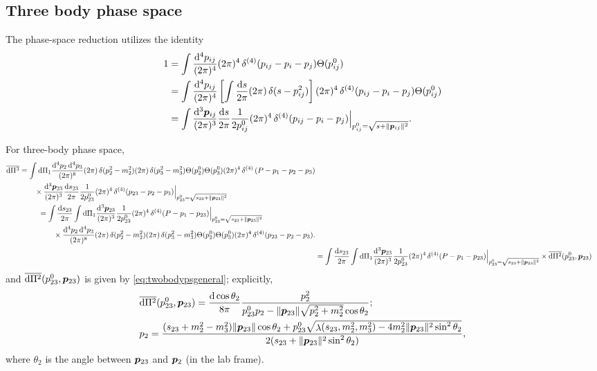 \documentclass[CheatSheet]{subfiles}
\begin{document}
\subsection{Three body phase space}
The phase-space reduction utilizes the identity~\cite{Hitoshi233B}
\begin{align}
 1
&= \int\frac{\dd^4 p_{ij}}{(2\pi)^4}(2\pi)^4\diracdelta[4](p_{ij}-p_i-p_j)\Theta(p_{ij}^0)
\\
&= \int\frac{\dd^4 p_{ij}}{(2\pi)^4}
\left[\int\frac{\dd s}{2\pi}(2\pi)\diracdelta(s-p_{ij}^2)\right]
(2\pi)^4\diracdelta[4](p_{ij}-p_i-p_j)\Theta(p_{ij}^0)
\\
&= \int\ddP{p_{ij}}
\frac{\dd s}{2\pi}\frac{1}{2p_{ij}^0}
(2\pi)^4\diracdelta[4](p_{ij}-p_i-p_j)\Big|_{p_{ij}^0=\sqrt{s+\|\vc p_{ij}\|^2}}.
\end{align}

For three-body phase space,
\begin{align}
\begin{split}
  \overline{\dd\Pi^3}
 &= \int\dd\Pi_1
 \frac{\dd^4 p_2\dd^4 p_3}{(2\pi)^8}
 (2\pi)\diracdelta(p_2^2-m_2^2)
 (2\pi)\diracdelta(p_3^2-m_3^2)
 \Theta(p_2^0)\Theta(p_3^0)
 (2\pi)^4\diracdelta[4]\left(P-p_1-p_2-p_3\right)
 \\&\qquad\times
\ddP{p_{23}}
\frac{\dd s_{23}}{2\pi}\frac{1}{2p_{23}^0}
(2\pi)^4\diracdelta[4](p_{23}-p_2-p_3)\Big|_{p_{23}^0=\sqrt{s_{23}+\|\vc p_{23}\|^2}}
\end{split}
\\
\begin{split}
 &= \int
\frac{\dd s_{23}}{2\pi}
\int
\dd\Pi_1
\ddP{p_{23}}
\frac{1}{2p_{23}^0}
 (2\pi)^4\diracdelta[4](P-p_1-p_{23})
\Big|_{p_{23}^0=\sqrt{s_{23}+\|\vc p_{23}\|^2}}
 \\&\qquad\times
 \frac{\dd^4 p_2\dd^4 p_3}{(2\pi)^8}
 (2\pi)\diracdelta(p_2^2-m_2^2)
 (2\pi)\diracdelta(p_3^2-m_3^2)
 \Theta(p_2^0)\Theta(p_3^0)
(2\pi)^4\diracdelta[4](p_{23}-p_2-p_3).
\end{split}
\\ &= \int
\frac{\dd s_{23}}{2\pi}
\int
\dd\Pi_1
\ddP{p_{23}}
\frac{1}{2p_{23}^0}
 (2\pi)^4\diracdelta[4](P-p_1-p_{23})
\Big|_{p_{23}^0=\sqrt{s_{23}+\|\vc p_{23}\|^2}}
\times \overline{\dd\Pi^2}(p^0_{23}, \vc p_{23})
\end{align}
and $\overline{\mathop{}\!\mathrm{d}\Pi^2}(p^0_{23}, {\boldsymbol{p}}_{23})$ is given by \cref{eq:twobodypsgeneral}; explicitly,
\begin{align}
& \overline{\mathop{}\!\mathrm{d}\Pi^2}(p^0_{23}, {\boldsymbol{p}}_{23}) = 
\frac{\mathop{}\!\mathrm{d}\cos\theta_{2}}{8\pi}
\frac{p_{2}^2}{p^0_{23}p_2 - \|{\boldsymbol{p}}_{23}\|\sqrt{p_2^2+m_2^2}\cos\theta_2};
\\
&
p_2=\frac{(s_{23}+m_2^2-m_3^2)\|{\boldsymbol{p}}_{23}\|\cos\theta_2
 + p_{23}^0\sqrt{\mathop{\lambda}(s_{23},m_2^2,m_3^2)-4m_2^2 \|{\boldsymbol{p}}_{23}\|^2 \sin^2\theta_2}
}{2(s_{23}+\|{\boldsymbol{p}}_{23}\|^2\sin^2\theta_2)},
\end{align}
where $\theta_2$ is the angle between ${\boldsymbol{p}}_{23}$ and ${\boldsymbol{p}}_2$ (in the lab frame).
\end{document}
